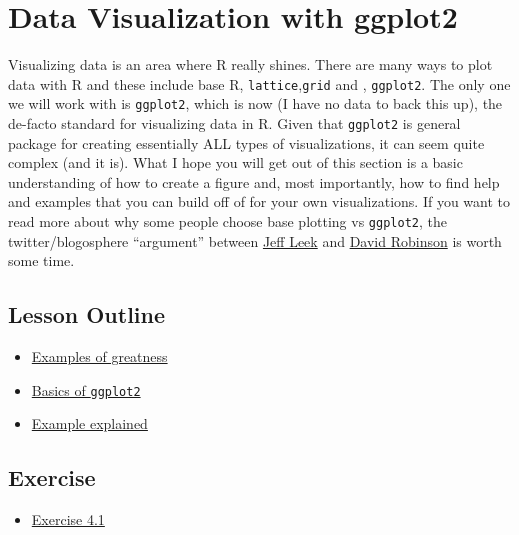 \documentclass[]{article}
\title{}
\author{}
\date{}
\providecommand{\tightlist}{%
  \setlength{\itemsep}{0pt}\setlength{\parskip}{0pt}}
\begin{document}
\hypertarget{data-visualization-with-ggplot2}{%
\section{Data Visualization with
ggplot2}\label{data-visualization-with-ggplot2}}

Visualizing data is an area where R really shines. There are many ways
to plot data with R and these include base R,
\texttt{lattice},\texttt{grid} and , \texttt{ggplot2}. The only one we
will work with is \texttt{ggplot2}, which is now (I have no data to back
this up), the de-facto standard for visualizing data in R. Given that
\texttt{ggplot2} is general package for creating essentially ALL types
of visualizations, it can seem quite complex (and it is). What I hope
you will get out of this section is a basic understanding of how to
create a figure and, most importantly, how to find help and examples
that you can build off of for your own visualizations. If you want to
read more about why some people choose base plotting vs
\texttt{ggplot2}, the twitter/blogosphere ``argument'' between
\href{https://simplystatistics.org/2016/02/11/why-i-dont-use-ggplot2/}{Jeff
Leek} and \href{http://varianceexplained.org/r/why-I-use-ggplot2/}{David
Robinson} is worth some time.

\hypertarget{lesson-outline}{%
\subsection{Lesson Outline}\label{lesson-outline}}

\begin{itemize}
\tightlist
\item
  \protect\hyperlink{examples-of-greatness}{Examples of greatness}
\item
  \protect\hyperlink{basics-of-ggplot2}{Basics of \texttt{ggplot2}}
\item
  \protect\hyperlink{example-explained}{Example explained}
\end{itemize}

\hypertarget{exercise}{%
\subsection{Exercise}\label{exercise}}

\begin{itemize}
\tightlist
\item
  \protect\hyperlink{exercise-41}{Exercise 4.1}
\end{itemize}
\end{document}
